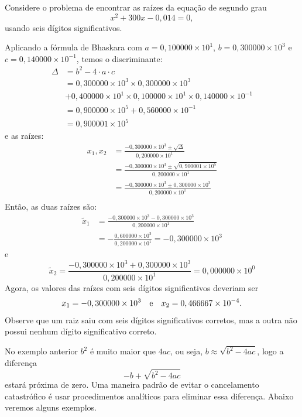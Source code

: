 \documentclass[main.tex]{subfiles}
\begin{document}
\begin{ex} Considere o problema de encontrar as raízes da equação de segundo grau
  \begin{equation*}
    x^2+300x-0,014=0,
  \end{equation*}
usando seis dígitos significativos.

Aplicando a fórmula de Bhaskara com $a=0,100000\times 10^1$, $b=0,300000\times 10^3$ e $c=0,140000\times 10^{-1}$, temos o discriminante:
\begin{align*}
  \Delta &= b^2 - 4\cdot a\cdot c\\
  &=0,300000\times 10^3\times 0,300000\times 10^3 \\
  &+ 0,400000\times 10^1\times 0,100000\times 10^1\times 0,140000\times 10^{-1}\\
  &=0,900000\times 10^5 +0,560000\times  10^{-1}\\
  &=0,900001\times 10^5
\end{align*}
e as raízes:
\begin{align*}
x_1,x_2 &=\frac{-0,300000\times 10^3\pm \sqrt{\Delta}}{0,200000\times 10^1} \\
&=\frac{-0,300000\times 10^3\pm \sqrt{0,900001\times 10^5}}{0,200000\times 10^1} \\
&=\frac{-0,300000\times 10^3\pm 0,300000\times 10^3}{0,200000\times 10^1}\\
\end{align*}
Então, as duas raízes são:
\begin{align*}
  \tilde{x}_1 &= \frac{-0,300000\times 10^3- 0,300000\times 10^3}{0,200000\times 10^1}\\
  &=-\frac{0,600000\times 10^3}{0,200000\times 10^1}=-0,300000\times 10^3
\end{align*}
e
\begin{equation*}
\tilde{x}_2=\frac{-0,300000\times 10^3+ 0,300000\times 10^3}{0,200000\times 10^1}=0,000000\times 10^{0} 
\end{equation*}
Agora, os valores das raízes com seis dígitos significativos deveriam ser
\begin{equation*}
  x_1=-0,300000\times 10^{3}\quad\hbox{e}\quad x_2=0,466667\times 10^{-4}.  
\end{equation*}
Observe que um raiz saiu com seis dígitos significativos corretos, mas a outra não possui nenhum dígito significativo correto.
\end{ex}

\begin{obs}
No exemplo anterior $b^2$ é muito maior que $4ac$, ou seja, $b\approx \sqrt{b^2-4ac}$, logo a diferença
\begin{equation*}
  -b+\sqrt{b^2-4ac}
\end{equation*}
estará próxima de zero. Uma maneira padrão de evitar o cancelamento catastrófico é usar procedimentos analíticos para eliminar essa diferença. Abaixo veremos alguns exemplos.  
\end{obs}
\end{document}
